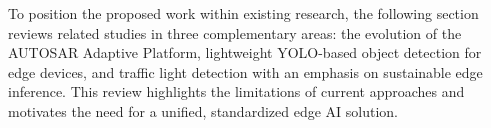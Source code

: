 To position the proposed work within existing research, the following section reviews related studies in three complementary areas: the evolution of the AUTOSAR Adaptive Platform, lightweight YOLO-based object detection for edge devices, and traffic light detection with an emphasis on sustainable edge inference. This review highlights the limitations of current approaches and motivates the need for a unified, standardized edge AI solution.

